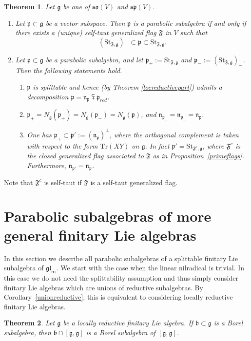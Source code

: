 \documentclass{article}
\newcommand {\tr} {\mathrm{Tr}}
\newcommand {\St} {\mathrm{St}}
\def\b{\mathfrak {b}}
\def\gl{\mathfrak {gl}}
\def\g{\mathfrak {g}}
\def\n{\mathfrak {n}}
\def\p{\mathfrak {p}}
\def\so{\mathfrak{so}}
\def\sp{\mathfrak{sp}}
\def\F{\mathfrak{F}}
\newtheorem{thm}{Theorem}[section]
\begin{document}
\begin{thm} \label{sospcharacterization}
Let $\g$ be one of $\so(V)$ and $\sp(V)$.

\begin{enumerate}
\item Let $\p \subset \g$ be a vector subspace.  Then $\p$ is a parabolic subalgebra if and only if there exists a (unique) self-taut generalized flag $\F$ in $V$ such that $$(\St_{\F,\g})_- \subset \p \subset \St_{\F,\g}.$$  

\item Let $\p \subset \g$ be a parabolic subalgebra, and let $\p_+ := \St_{\F,\g}$ and $\p_- := (\St_{\F,\g})_- $.  Then the following statements hold.
\begin{enumerate}
\item $\p$ is splittable and hence (by Theorem \ref{locreductivepart}) admits a decomposition $\p = \n_\p \subsetplus \p_{red}$.
\item $\p_+ = N_\g(\p_+) = N_\g(\p_-) = N_\g(\p)$, and $\n_{\p_+} = \n_{\p_-} = \n_\p$.
\item One has $\p_+ \subset \p' := (\n_\p)^\perp$, where the orthogonal complement is taken with respect to the form $\tr(XY)$ on $\g$.  In fact $\p' = \St_{\F^c , \g}$, where $\F^c$ is the closed generalized flag associated to $\F$ as in Proposition~\ref{primeflags}.  Furthermore, $\n_{\p'} = \n_\p$. 
\end{enumerate}
\end{enumerate}
\end{thm}

Note that $\F^c$ is self-taut if $\F$ is a self-taut generalized flag.


\section{Parabolic subalgebras of more general finitary Lie algebras} \label{generalparabolic}


In this section we describe all parabolic subalgebras of a splittable finitary Lie subalgebra of $\gl_\infty$. We start with the case when the linear nilradical is trivial.  In this case we do not need the splittability assumption and thus simply consider finitary Lie algebras which are unions of reductive subalgebras.  By Corollary~\ref{unionreductive}, this is equivalent to considering locally reductive finitary Lie algebras.


\begin{thm} \label{finitaryborel}
Let $\g$ be a locally reductive finitary Lie algebra.  If $\b \subset \g$ is a Borel subalgebra, then $\b \cap [\g,\g]$ is a Borel subalgebra of $[\g,\g]$.
\end{thm}
\end{document}
